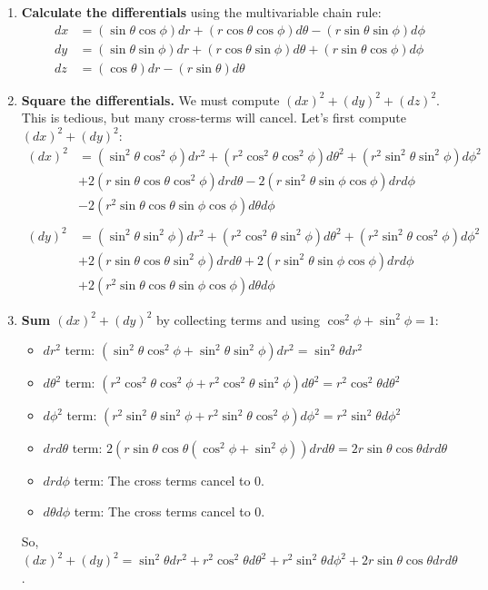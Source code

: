 \documentclass[11pt, a4paper]{report}
\begin{document}
\begin{enumerate}
    \item \textbf{Calculate the differentials} using the multivariable chain rule:
    \begin{align*}
        dx &= (\sin\theta\cos\phi)dr + (r\cos\theta\cos\phi)d\theta - (r\sin\theta\sin\phi)d\phi \\
        dy &= (\sin\theta\sin\phi)dr + (r\cos\theta\sin\phi)d\theta + (r\sin\theta\cos\phi)d\phi \\
        dz &= (\cos\theta)dr - (r\sin\theta)d\theta
    \end{align*}
    \item \textbf{Square the differentials.} We must compute $(dx)^2 + (dy)^2 + (dz)^2$. This is tedious, but many cross-terms will cancel. Let's first compute $(dx)^2 + (dy)^2$:
    \begin{align*}
        (dx)^2 &= (\sin^2\theta\cos^2\phi)dr^2 + (r^2\cos^2\theta\cos^2\phi)d\theta^2 + (r^2\sin^2\theta\sin^2\phi)d\phi^2 \\
                &+ 2(r\sin\theta\cos\theta\cos^2\phi)dr d\theta - 2(r\sin^2\theta\sin\phi\cos\phi)dr d\phi \\
                &- 2(r^2\sin\theta\cos\theta\sin\phi\cos\phi)d\theta d\phi \\
        \\
        (dy)^2 &= (\sin^2\theta\sin^2\phi)dr^2 + (r^2\cos^2\theta\sin^2\phi)d\theta^2 + (r^2\sin^2\theta\cos^2\phi)d\phi^2 \\
                &+ 2(r\sin\theta\cos\theta\sin^2\phi)dr d\theta + 2(r\sin^2\theta\sin\phi\cos\phi)dr d\phi \\
                &+ 2(r^2\sin\theta\cos\theta\sin\phi\cos\phi)d\theta d\phi
    \end{align*}
    \item \textbf{Sum $(dx)^2 + (dy)^2$} by collecting terms and using $\cos^2\phi + \sin^2\phi = 1$:
    \begin{itemize}
        \item $dr^2$ term: $(\sin^2\theta\cos^2\phi + \sin^2\theta\sin^2\phi)dr^2 = \sin^2\theta dr^2$
        \item $d\theta^2$ term: $(r^2\cos^2\theta\cos^2\phi + r^2\cos^2\theta\sin^2\phi)d\theta^2 = r^2\cos^2\theta d\theta^2$
        \item $d\phi^2$ term: $(r^2\sin^2\theta\sin^2\phi + r^2\sin^2\theta\cos^2\phi)d\phi^2 = r^2\sin^2\theta d\phi^2$
        \item $dr d\theta$ term: $2(r\sin\theta\cos\theta(\cos^2\phi + \sin^2\phi))dr d\theta = 2r\sin\theta\cos\theta dr d\theta$
        \item $dr d\phi$ term: The cross terms cancel to 0.
        \item $d\theta d\phi$ term: The cross terms cancel to 0.
    \end{itemize}
    So, $(dx)^2 + (dy)^2 = \sin^2\theta dr^2 + r^2\cos^2\theta d\theta^2 + r^2\sin^2\theta d\phi^2 + 2r\sin\theta\cos\theta dr d\theta$.
    

\end{enumerate}
\end{document}
